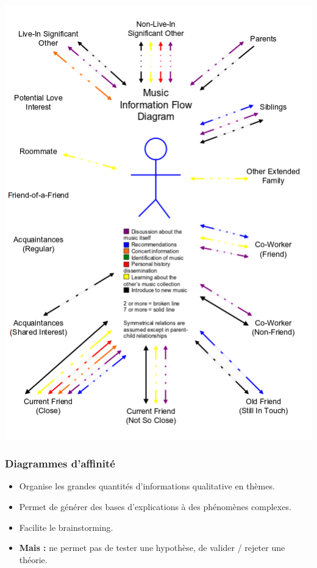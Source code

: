 \documentclass{beamer}
\begin{document}
\begin{frame}
\begin{center}
\includegraphics[scale=0.35]{flow_diag.png}
\end{center}
\end{frame}


\begin{frame}
\frametitle{Diagrammes d'affinité}
\begin{itemize}
	\item Organise les grandes quantités d'informations qualitative en thèmes.
	\item Permet de générer des bases d'explications à des phénomènes complexes.
	\item Facilite le brainstorming.
	
	\item \textbf{Mais : } ne permet pas de tester une hypothèse, de valider / rejeter une théorie.
\end{itemize}
\end{frame}
\end{document}
